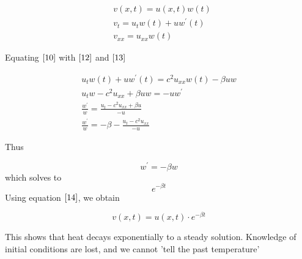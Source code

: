 \documentclass{article}
\begin{document}
\begin{align}
&v(x,t) = u(x,t)w(t) \label{14}\\
&v_t = u_tw(t) + uw^{'}(t) \label{12} \\
&v_{xx} = u_{xx}w(t) \label{13}
\end{align}

Equating $\eqref{10}$ with $\eqref{12}$ and $\eqref{13}$

\begin{align*}
u_t w(t) + u w^{'} (t) = c^2u_{xx} w(t) - \beta u w \\
u_t w - c^2 u_{xx}  + \beta u w = -uw^{'} \\
\frac{w^{'}}{w} = \frac{u_t -c^2 u_{xx} + \beta u}{-u} \\
\frac{w^{'}}{w} = -\beta - \frac{u_t-c^2u_{xx}}{-u}
\end{align*}

Thus

$$
w^{'} = -\beta w
$$
which solves to
$$
e^{-\beta t}
$$
Using equation $\eqref{14}$, we obtain

$$v(x,t) = u(x,t) \cdot e^{-\beta t}$$

This shows that heat decays exponentially to a steady solution. Knowledge of initial conditions are lost, and we cannot 'tell the past temperature'
\end{document}

